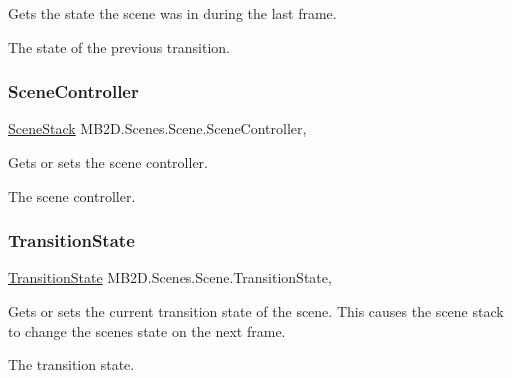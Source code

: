 Gets the state the scene was in during the last frame. 

The state of the previous transition.\hypertarget{class_m_b2_d_1_1_scenes_1_1_scene_ad32d9d738f33bd710184f7eda6a43ddf}{}\label{class_m_b2_d_1_1_scenes_1_1_scene_ad32d9d738f33bd710184f7eda6a43ddf} 
\subsubsection{\texorpdfstring{Scene\+Controller}{SceneController}}
{\footnotesize\ttfamily \hyperlink{class_m_b2_d_1_1_scenes_1_1_scene_stack}{Scene\+Stack} M\+B2\+D.\+Scenes.\+Scene.\+Scene\+Controller\hspace{0.3cm}{\ttfamily [get]}, {\ttfamily [set]}}



Gets or sets the scene controller. 

The scene controller.\hypertarget{class_m_b2_d_1_1_scenes_1_1_scene_a6167906306d4c7d9a7a4fbd6909c9d12}{}\label{class_m_b2_d_1_1_scenes_1_1_scene_a6167906306d4c7d9a7a4fbd6909c9d12} 
\subsubsection{\texorpdfstring{Transition\+State}{TransitionState}}
{\footnotesize\ttfamily \hyperlink{namespace_m_b2_d_1_1_scenes_a0e0db3f97bbaa272f70534c5954c4acc}{Transition\+State} M\+B2\+D.\+Scenes.\+Scene.\+Transition\+State\hspace{0.3cm}{\ttfamily [get]}, {\ttfamily [set]}}



Gets or sets the current transition state of the scene. This causes the scene stack to change the scenes state on the next frame. 

The transition state.\hypertarget{class_m_b2_d_1_1_scenes_1_1_scene_abfa7329c484e4af3153469eb278fcb69}{}\label{class_m_b2_d_1_1_scenes_1_1_scene_abfa7329c484e4af3153469eb278fcb69} 
